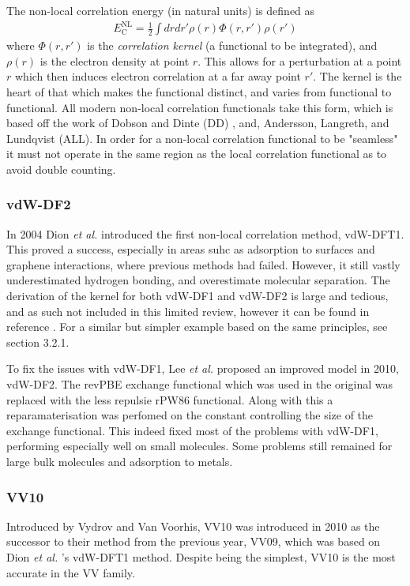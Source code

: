 \documentclass[10pt,a4paper,twocolumn,twoside]{extarticle}
\newcommand{\al}{\emph{et al. }}
\begin{document}
	The non-local correlation energy (in natural units) is defined as 
	\begin{align}
		E^\text{NL}_\text{C} = \frac{1}{2} \int dr dr' \rho(r) \Phi(r, r') \rho(r')
	\end{align}
	where $\Phi(r, r')$ is the \emph{correlation kernel} (a functional to be integrated), and $\rho(r)$ is the electron density at point $r$. This allows for a perturbation at a point $r$ which then induces electron correlation at a far away point $r'$. The kernel is the heart of that which makes the functional distinct, and varies from functional to functional. All modern non-local correlation functionals take this form, which is based off the work of Dobson and Dinte (DD) \cite{DD}, and, Andersson, Langreth, and Lundqvist (ALL)\cite{ALL}.
	In order for a non-local correlation functional to be "seamless" it must not operate in the same region as the local correlation functional as to avoid double counting. 

	\subsubsection{vdW-DF2}
	In 2004 Dion \al introduced the first non-local correlation method, vdW-DFT1. \cite{vdw04Original-Dion2004} This proved a success, especially in areas suhc as adsorption to surfaces and graphene interactions, where previous methods had failed. \cite{vdW-review} However, it still vastly underestimated hydrogen bonding, and overestimate molecular separation. The derivation of the kernel for both vdW-DF1 and vdW-DF2 is large and tedious, and as such not included in this limited review, however it can be found in reference \cite{vdw04Original-Dion2004}. For a similar but simpler example based on the same principles, see section 3.2.1.

	To fix the issues with vdW-DF1, Lee \al proposed an improved model in 2010, vdW-DF2. \cite{Lee2010-vdW-DF2-Original} The revPBE\cite{revPBE} exchange functional which was used in the original was replaced with the less repulsie rPW86 functional. \cite{rPW86} Along with this a reparamaterisation was perfomed on the constant controlling the size of the exchange functional. This indeed fixed most of the problems with vdW-DF1, performing especially well on small molecules. Some problems still remained for large bulk molecules and adsorption to metals. 


	\subsubsection{VV10}
	Introduced by Vydrov and Van Voorhis, VV10 was introduced in 2010 as the successor to their method from the previous year, VV09, which was based on Dion \al's vdW-DFT1 method.\cite{VV09Original-Vydrov2009}\cite{Vydrov2010} 
	Despite being the simplest, VV10 is the most accurate in the VV family.\cite{Grimme2011} 
\end{document}
